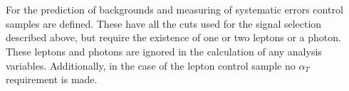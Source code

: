 \\\\
For the prediction of backgrounds and measuring of systematic errors control samples are defined. These have all the cuts used for the signal selection described above, but require the existence of one or two leptons or a photon. These leptons and photons are ignored in the calculation of any analysis variables. Additionally, in the case of the lepton control sample no $\alpha_T$ requirement is made.